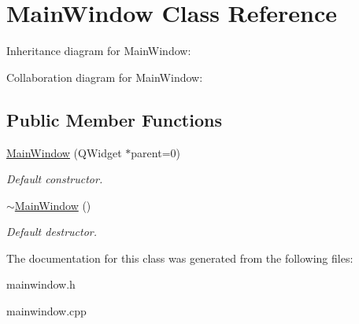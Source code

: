 \hypertarget{class_main_window}{}\section{Main\+Window Class Reference}
\label{class_main_window}


Inheritance diagram for Main\+Window\+:


Collaboration diagram for Main\+Window\+:
\subsection*{Public Member Functions}
\begin{DoxyCompactItemize}
\item 
\hypertarget{class_main_window_a8b244be8b7b7db1b08de2a2acb9409db}{}\hyperlink{class_main_window_a8b244be8b7b7db1b08de2a2acb9409db}{Main\+Window} (Q\+Widget $\ast$parent=0)\label{class_main_window_a8b244be8b7b7db1b08de2a2acb9409db}

\begin{DoxyCompactList}\small\item\em Default constructor. \end{DoxyCompactList}\item 
\hypertarget{class_main_window_ae98d00a93bc118200eeef9f9bba1dba7}{}\hyperlink{class_main_window_ae98d00a93bc118200eeef9f9bba1dba7}{$\sim$\+Main\+Window} ()\label{class_main_window_ae98d00a93bc118200eeef9f9bba1dba7}

\begin{DoxyCompactList}\small\item\em Default destructor. \end{DoxyCompactList}\end{DoxyCompactItemize}


The documentation for this class was generated from the following files\+:\begin{DoxyCompactItemize}
\item 
mainwindow.\+h\item 
mainwindow.\+cpp\end{DoxyCompactItemize}
